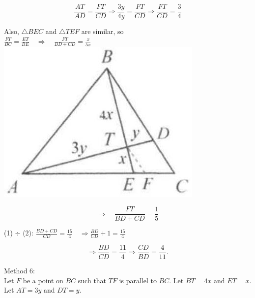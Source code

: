\documentclass[10pt]{article}
\begin{document}
\[
\frac{A T}{A D}=\frac{F T}{C D} \Rightarrow \frac{3 y}{4 y}=\frac{F T}{C D} \Rightarrow \frac{F T}{C D}=\frac{3}{4}
\]

Also, \(\triangle B E C\) and \(\triangle T E F\) are similar, so\\
\(\frac{F T}{B C}=\frac{E T}{B E} \quad \Rightarrow \quad \frac{F T}{B D+C D}=\frac{x}{5 x}\)\\
\includegraphics[max width=\textwidth, center]{2025_04_17_97bc1f7e44d93c271a88g-105(1)}

\[
\Rightarrow \quad \frac{F T}{B D+C D}=\frac{1}{5}
\]

(1) \(\div\) (2): \(\frac{B D+C D}{C D}=\frac{15}{4} \quad \Rightarrow \frac{B D}{C D}+1=\frac{15}{4}\)

\[
\Rightarrow \frac{B D}{C D}=\frac{11}{4} \Rightarrow \frac{C D}{B D}=\frac{4}{11} .
\]

Method 6:\\
Let \(F\) be a point on \(B C\) such that \(T F\) is parallel to \(B C\). Let \(B T=4 x\) and \(E T=x\). Let \(A T=3 y\) and \(D T=y\).
\end{document}
